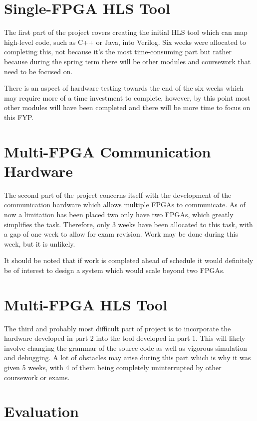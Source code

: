 \section{Single-FPGA HLS Tool}

The first part of the project covers creating the initial HLS tool which can map high-level code, such as C++ or Java, into Verilog. Six weeks were allocated to completing this, not because it's the most time-consuming part but rather because during the spring term there will be other modules and coursework that need to be focused on.

There is an aspect of hardware testing towards the end of the six weeks which may require more of a time investment to complete, however, by this point most other modules will have been completed and there will be more time to focus on this FYP.

\section{Multi-FPGA Communication Hardware}

The second part of the project concerns itself with the development of the communication hardware which allows multiple FPGAs to communicate. As of now a limitation has been placed two only have two FPGAs, which greatly simplifies the task. Therefore, only 3 weeks have been allocated to this task, with a gap of one week to allow for exam revision. Work may be done during this week, but it is unlikely.

It should be noted that if work is completed ahead of schedule it would definitely be of interest to design a system which would scale beyond two FPGAs.

\section{Multi-FPGA HLS Tool}

The third and probably most difficult part of project is to incorporate the hardware developed in part 2 into the tool developed in part 1. This will likely involve changing the grammar of the source code as well as vigorous simulation and debugging. A lot of obstacles may arise during this part which is why it was given 5 weeks, with 4 of them being completely uninterrupted by other coursework or exams.

\section{Evaluation}

